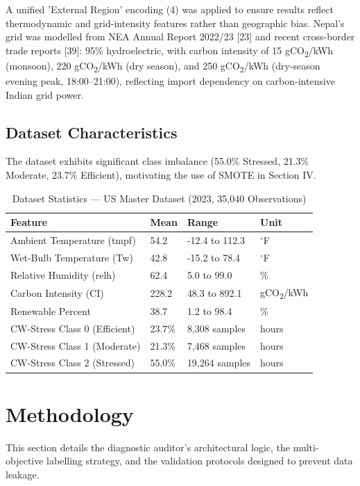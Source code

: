 \documentclass[conference]{IEEEtran}
\begin{document}
A unified 'External Region' encoding (4) was applied to ensure results reflect thermodynamic and grid-intensity features rather than geographic bias. Nepal's grid was modelled from NEA Annual Report 2022/23 [23] and recent cross-border trade reports [39]: 95\% hydroelectric, with carbon intensity of 15 gCO\textsubscript{2}/kWh (monsoon), 220 gCO\textsubscript{2}/kWh (dry season), and 250 gCO\textsubscript{2}/kWh (dry-season evening peak, 18:00–21:00), reflecting import dependency on carbon-intensive Indian grid power.

\subsection{Dataset Characteristics}
The dataset exhibits significant class imbalance (55.0\% Stressed, 21.3\% Moderate, 23.7\% Efficient), motivating the use of SMOTE in Section IV.

\begin{table}[htbp]
\caption{Dataset Statistics — US Master Dataset (2023, 35,040 Observations)}
\begin{center}
\begin{tabularx}{\columnwidth}{|X|l|l|l|}
\hline
\textbf{Feature} & \textbf{Mean} & \textbf{Range} & \textbf{Unit} \\ \hline
Ambient Temperature (tmpf) & 54.2 & -12.4 to 112.3 & $^\circ$F \\ \hline
Wet-Bulb Temperature (Tw) & 42.8 & -15.2 to 78.4 & $^\circ$F \\ \hline
Relative Humidity (relh) & 62.4 & 5.0 to 99.0 & \% \\ \hline
Carbon Intensity (CI) & 228.2 & 48.3 to 892.1 & gCO\textsubscript{2}/kWh \\ \hline
Renewable Percent & 38.7 & 1.2 to 98.4 & \% \\ \hline
CW-Stress Class 0 (Efficient) & 23.7\% & 8,308 samples & hours \\ \hline
CW-Stress Class 1 (Moderate) & 21.3\% & 7,468 samples & hours \\ \hline
CW-Stress Class 2 (Stressed) & 55.0\% & 19,264 samples & hours \\ \hline
\end{tabularx}
\end{center}
\end{table}

\section{Methodology}
This section details the diagnostic auditor’s architectural logic, the multi-objective labelling strategy, and the validation protocols designed to prevent data leakage.
\end{document}
